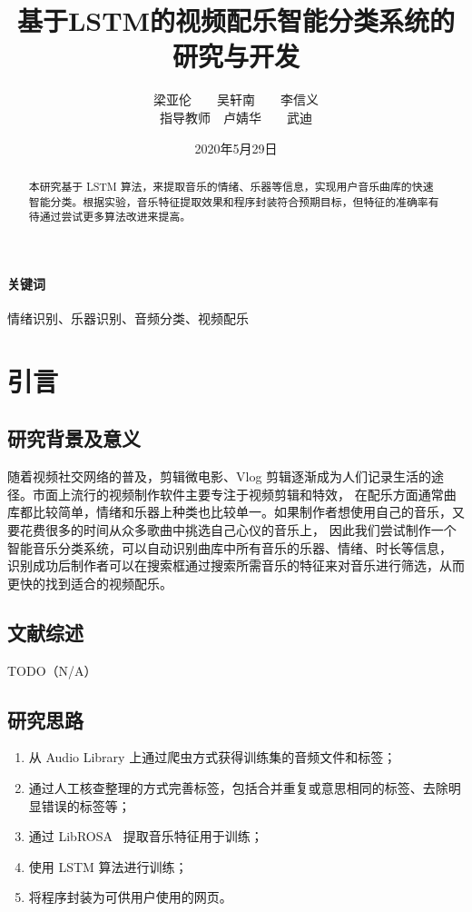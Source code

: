 \documentclass[a4paper,utf8,10pt]{article}
\title{基于LSTM的视频配乐智能分类系统的研究与开发}
\author{梁亚伦　　吴轩南　　李信义 \\ 指导教师　卢婧华　　武迪}
\date{2020年5月29日}
\newcommand{\sept}{\setlength\itemsep{-4pt}}
\begin{document}
\maketitle

\begin{abstract}
本研究基于 LSTM 算法，来提取音乐的情绪、乐器等信息，实现用户音乐曲库的快速智能分类。根据实验，音乐特征提取效果和程序封装符合预期目标，但特征的准确率有待通过尝试更多算法改进来提高。
\end{abstract}

\paragraph{关键词} 情绪识别、乐器识别、音频分类、视频配乐
\vspace{\baselineskip}

\section{引言}

\subsection{研究背景及意义}

随着视频社交网络的普及，剪辑微电影、Vlog 剪辑逐渐成为人们记录生活的途径。市面上流行的视频制作软件主要专注于视频剪辑和特效，
在配乐方面通常曲库都比较简单，情绪和乐器上种类也比较单一。如果制作者想使用自己的音乐，又要花费很多的时间从众多歌曲中挑选自己心仪的音乐上，
因此我们尝试制作一个智能音乐分类系统，可以自动识别曲库中所有音乐的乐器、情绪、时长等信息，
识别成功后制作者可以在搜索框通过搜索所需音乐的特征来对音乐进行筛选，从而更快的找到适合的视频配乐。

\subsection{文献综述}

TODO（N/A）\cite{boixx14}

\subsection{研究思路}

\begin{enumerate}
  \sept
  \item 从 Audio Library 上通过爬虫方式获得训练集的音频文件和标签；
  \item 通过人工核查整理的方式完善标签，包括合并重复或意思相同的标签、去除明显错误的标签等；
  \item 通过 LibROSA~\cite{librosa18} 提取音乐特征用于训练；
  \item 使用 LSTM 算法进行训练；
  \item 将程序封装为可供用户使用的网页。
\end{enumerate}
\end{document}

